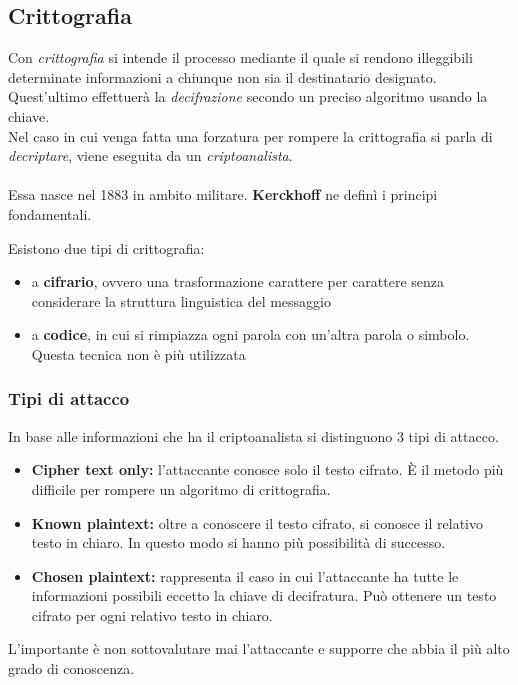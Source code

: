 \documentclass[10pt,a4paper,twoside]{article}
\begin{document}
\subsection{Crittografia}
Con \textit{crittografia} si intende il processo mediante il quale si rendono illeggibili determinate informazioni a chiunque non sia il destinatario designato. Quest'ultimo effettuerà la \textit{decifrazione} secondo un preciso algoritmo usando la chiave.\\
Nel caso in cui venga fatta una forzatura per rompere la crittografia si parla di \textit{decriptare}, viene eseguita da un \textit{criptoanalista}.\\\\
Essa nasce nel 1883 in ambito militare. \textbf{Kerckhoff} ne definì i principi fondamentali.
Esistono due tipi di crittografia:
\begin{itemize}
\item a \textbf{cifrario}, ovvero una trasformazione carattere per carattere senza considerare la struttura linguistica del messaggio
\item a \textbf{codice}, in cui si rimpiazza ogni parola con un'altra parola o simbolo. Questa tecnica non è più utilizzata
\end{itemize}

\subsubsection{Tipi di attacco}
In base alle informazioni che ha il criptoanalista si distinguono 3 tipi di attacco.
\begin{itemize}
\item \textbf{Cipher text only:} l'attaccante conosce solo il testo cifrato. È il metodo più difficile per rompere un algoritmo di crittografia.
\item \textbf{Known plaintext:} oltre a conoscere il testo cifrato, si conosce il relativo testo in chiaro. In questo modo si hanno più possibilità di successo.
\item \textbf{Chosen plaintext:} rappresenta il caso in cui l'attaccante ha tutte le informazioni possibili eccetto la chiave di decifratura. Può ottenere un testo cifrato per ogni relativo testo in chiaro.
\end{itemize}
L'importante è non sottovalutare mai l'attaccante e supporre che abbia il più alto grado di conoscenza.
\end{document}
